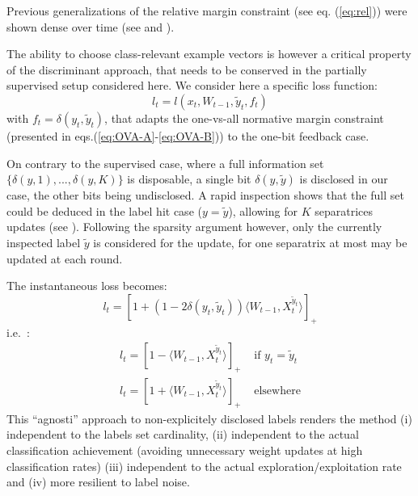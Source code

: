 \documentclass[preprint,12pt,authoryear]{elsarticle}
\begin{document}
{\color{green} Previous generalizations of the relative margin constraint (see eq. (\ref{eq:rel})) were shown dense over time (see \cite{kakade2008efficient} and \cite{zhong2015esann}).} 

The ability to choose class-relevant example vectors is however a critical property of the discriminant approach, that needs to be conserved in the partially supervised setup considered here. 
We consider here a specific loss function:
$$l_t = l(x_t,W_{t-1},\tilde{y}_t,f_t)$$
with $f_t = \delta(y_t,\tilde{y}_t)$,
that adapts the one-vs-all normative margin constraint (presented in eqs.(\ref{eq:OVA-A}-\ref{eq:OVA-B})) to the one-bit feedback case. 

On contrary to the supervised case, where a full information set $\{\delta(y,1), ..., \delta(y,K)\}$ is disposable, a single bit $\delta(y,\tilde{y})$ is disclosed in our case, the other bits being undisclosed. 
A rapid inspection shows that the full set could be deduced in the label hit case ($y = \tilde{y}$), allowing for $K$ separatrices updates (see \cite{chen2009beyond}). Following the sparsity argument however,
only the  currently inspected label $\tilde{y}$ is  considered  for the update, for one separatrix at most may be updated at each round. 

The instantaneous loss becomes:
\begin{equation}\label{eq:loss}
l_t = [1 + (1 - 2 \delta(y_t,\tilde{y}_t)) \langle W_{t-1}, X_t^{\tilde{y}_t}\rangle]_+
\end{equation}
i.e.~:
\begin{align}
	l_t = [1 - \langle W_{t-1}, X_t^{\tilde{y}_t}\rangle]_+ &\text{ if }y_t=\tilde{y}_t\label{eq:loss-A}\\
	l_t = [1 + \langle W_{t-1}, X_t^{\tilde{y}_t}\rangle]_+ &\text{ elsewhere} \label{eq:loss-B}
\end{align}
{\color{blue} This ``agnosti'' approach to non-explicitely disclosed labels %
renders the method (i) independent to the labels set cardinality, (ii) independent to the actual classification achievement (avoiding unnecessary weight updates at high classification rates) (iii) independent to the actual exploration/exploitation rate and (iv) more resilient to label noise.}
\end{document}
